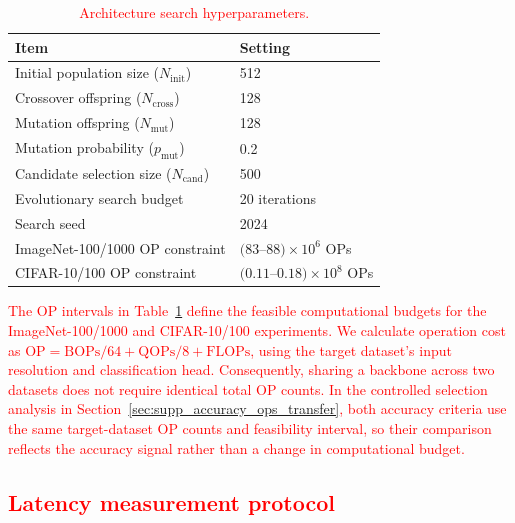 \documentclass[preprint,review,12p,times]{elsarticle}
\begin{document}
\begin{table}[!htbp]
    \centering
    \caption{\textcolor{red}{Architecture search hyperparameters.}}
    \label{tab:search_hyperparameters}
    \small
    {\color{red}
    \begin{tabularx}{\textwidth}{>{\raggedright\arraybackslash}p{} X}
    \toprule
    Item & Setting \\
    \midrule
    Initial population size ($N_{\text{init}}$) & 512 \\
    Crossover offspring ($N_{\text{cross}}$) & 128 \\
    Mutation offspring ($N_{\text{mut}}$) & 128 \\
    Mutation probability ($p_{\text{mut}}$) & 0.2 \\
    Candidate selection size ($N_{\text{cand}}$) & 500 \\
    Evolutionary search budget & 20 iterations \\
    Search seed & 2024 \\
    \midrule
    ImageNet-100/1000 OP constraint & $(83$--$88)\times10^6$ OPs \\
    CIFAR-10/100 OP constraint & $(0.11$--$0.18)\times10^8$ OPs \\
    \bottomrule
    \end{tabularx}}
\end{table}

\textcolor{red}{The OP intervals in Table~\ref{tab:search_hyperparameters} define the feasible computational budgets for the ImageNet-100/1000 and CIFAR-10/100 experiments. We calculate operation cost as $\mathrm{OP}=\mathrm{BOPs}/64+\mathrm{QOPs}/8+\mathrm{FLOPs}$, using the target dataset's input resolution and classification head. Consequently, sharing a backbone across two datasets does not require identical total OP counts. In the controlled selection analysis in Section~\ref{sec:supp_accuracy_ops_transfer}, both accuracy criteria use the same target-dataset OP counts and feasibility interval, so their comparison reflects the accuracy signal rather than a change in computational budget.}

\FloatBarrier
\subsection{\textcolor{red}{Latency measurement protocol}}
\end{document}
